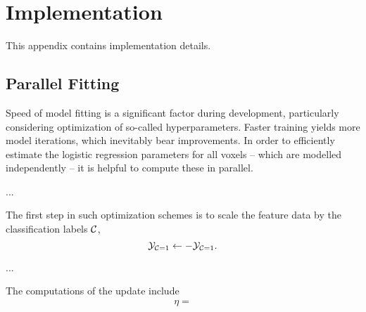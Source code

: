 \chapter{Implementation}
This appendix contains implementation details.
\section{Parallel Fitting}
Speed of model fitting is a significant factor during development, particularly considering optimization of so-called hyperparameters. Faster training yields more model iterations, which inevitably bear improvements. In order to efficiently estimate the logistic regression parameters for all voxels -- which are modelled independently -- it is helpful to compute these in parallel.
\par...\par
The first step in such optimization schemes is to scale the feature data by the classification labels $\mathcal{C}$,
\begin{equation}
  \mathcal{Y}_{\mathcal{C}=1} \leftarrow -\mathcal{Y}_{\mathcal{C}=1}.
\end{equation}
\par...\par
The computations of the update include
\begin{align*}
  \eta = 
\end{align*}
